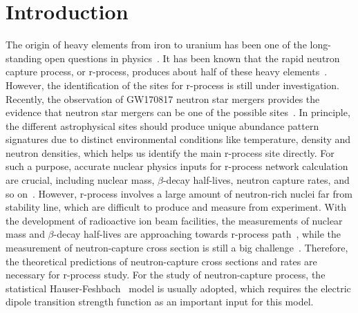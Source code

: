 \documentclass[prc,twocolumn,twoside,showpacs,superscriptaddress,floatfix]{revtex4-1}
\begin{document}
\section{Introduction}\label{sec:intro}

The origin of heavy elements from iron to uranium has been one of the
long-standing open questions in physics~\cite{discover}.
It has been known that
the rapid neutron capture process, or r-process, produces about half of these
heavy elements~\cite{Placeholder:01}.
However, the identification of the sites
for r-process is still under investigation.
Recently, the observation of
GW170817 neutron star mergers provides the evidence that neutron star mergers
can be one of the possible sites~\cite{Placeholder:02}.
In principle, the
different astrophysical sites should produce unique abundance pattern
signatures due to distinct environmental conditions like temperature, density
and neutron densities, which helps us identify the main r-process site
directly\cite{Placeholder:03}.
 For such a purpose, accurate nuclear physics
inputs for r-process network calculation are crucial, including nuclear mass,
$\beta$-decay half-lives, neutron capture rates, and so on~\cite{Placeholder:04}.
However, r-process involves a large amount of
neutron-rich nuclei far from stability line, which are difficult to produce and
measure from experiment.
With the development of radioactive ion beam
facilities, the measurements of nuclear mass and $\beta$-decay half-lives are
approaching towards r-process path~\cite{Placeholder:05}, while the measurement
of neutron-capture cross section is still a big challenge~\cite{Placeholder:06}.
Therefore, the theoretical predictions of
neutron-capture cross sections and rates are necessary for r-process study.
For
the study of neutron-capture process, the statistical Hauser-Feshbach~\cite{Placeholder:07} model is usually adopted, which requires the electric
dipole transition strength function as an important input for this model.
\end{document}
